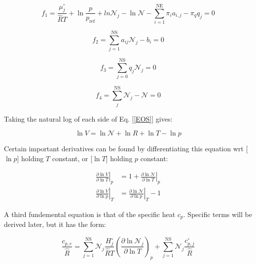 \documentclass[10pt]{article}
\begin{document}
\begin{flushleft}
\begin{equation}
        f_1 = \frac{\mu_j^\circ}{\hat{R}T} + \ln{\frac{p}{p_\text{ref}}} + ln{\mathcal{N}_j} - \ln{\mathcal{N}} - \sum_{i=1}^\text{NE}\pi_ia_{i,j} - \pi_q q_j = 0
\end{equation}

\begin{equation}
    f_2 = \sum_{j=1}^\text{NS} a_{ij} \mathcal{N}_j - b_i = 0
\end{equation}

\begin{equation}
    f_3 = \sum_{j=0}^\text{NS}q_j\mathcal{N}_j = 0
\end{equation}

\begin{equation}
    f_4 = \sum_j^\text{NS} \mathcal{N}_j - \mathcal{N} = 0
\end{equation}

Taking the natural log of each side of Eq. [\ref{EOS}] gives:

\begin{equation}
    \ln V = \ln \mathcal{N} + \ln R + \ln T - \ln p
\end{equation}

Certain important derivatives can be found by differentiating this equation wrt [$\ln p$] holding $T$ constant, or [$\ln T$] holding $p$ constant:

\begin{subequations}
    \begin{align}
        \left.\frac{\partial \ln V}{\partial \ln T} \right|_p &= 1 + \left.\frac{\partial \ln \mathcal{N}}{\partial \ln T}\right|_p \label{dlvdlT}
        \\ \left.\frac{\partial \ln V}{\partial \ln p} \right|_T &= \left.\frac{\partial \ln \mathcal{N}}{\partial \ln p}\right|_T - 1\label{dlvdlp}
    \end{align}    
\end{subequations}

A third fundemental equation is that of the specific heat $c_p$. Specific terms will be derived later, but it has the form:

    \begin{equation}
\frac{c_{p,e}}{\hat{R}} = \sum_{j=1}^\text{NS} \mathcal{N}_j \frac{H_j^\circ}{\hat{R}T} \left( \frac{\partial \ln \mathcal{N}_j}{\partial \ln T} \right)_p + \sum_{j=1}^\text{NS} \mathcal{N}_j \frac{c_{p,j}^\circ}{\hat{R}}
\end{equation}


\end{flushleft}
\end{document}
